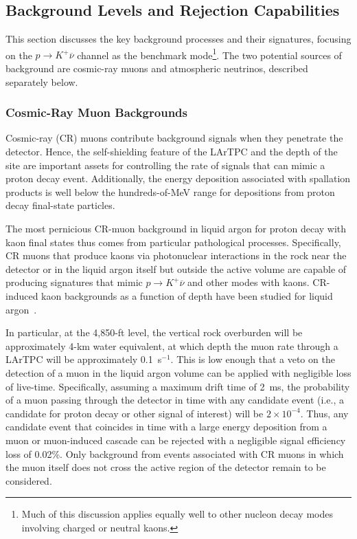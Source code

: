 \subsection{Background Levels and Rejection Capabilities}
\label{sec:pdk:background-rej}

This section discusses the key background processes and 
their signatures, focusing on the $p\to K^+\overline{\nu}$ 
channel as 
the benchmark mode\footnote{Much of this discussion applies 
equally well to other nucleon decay modes involving charged 
or neutral kaons.}.  The two potential sources 
of background are cosmic-ray muons and atmospheric 
neutrinos, described separately below.  

\subsubsection{Cosmic-Ray Muon Backgrounds}

Cosmic-ray (CR) muons contribute background signals when they
penetrate the detector.  Hence, the self-shielding feature of 
the LArTPC and the depth of the site are important assets for 
controlling the rate of signals that can mimic a proton decay 
event.  Additionally, the energy deposition associated 
with spallation products is well below the hundreds-of-MeV 
range for depositions from proton decay final-state particles.

The most pernicious CR-muon background in liquid argon for proton decay with kaon 
final states thus comes from particular pathological processes.  
Specifically, CR muons that
produce kaons via photonuclear interactions in the rock near
the detector or in the liquid argon itself but outside the active volume are 
capable of producing signatures that mimic $p\to K^+\overline{\nu}$ 
and other modes with kaons.  CR-induced kaon backgrounds as 
a function of depth have been studied for
liquid argon~\cite{Bueno:2007um,Bernstein:2009ms,DOCDB5904}.

In particular, at the 4,850-ft level, the vertical rock overburden will be
approximately 4-km water equivalent, at which depth the muon rate
through a  LArTPC will be approximately \SI{0.1}{s}$^{-1}$. This is
low enough that a veto on the detection of a muon in the liquid argon volume can
be applied with negligible loss of live-time.  Specifically, assuming
a maximum drift time of \SI{2}{\ms}, the probability of a muon passing
through the detector in time with any candidate event (i.e., a
candidate for proton decay or other signal of interest) will be $2
\times 10^{-4}$.  Thus, any candidate event that coincides in time
with a large energy deposition from a muon or muon-induced cascade can
be rejected with a negligible signal efficiency loss of 0.02\%.
Only background from events associated with CR muons in which
the muon itself does not cross the active region of the detector 
remain to be considered.

